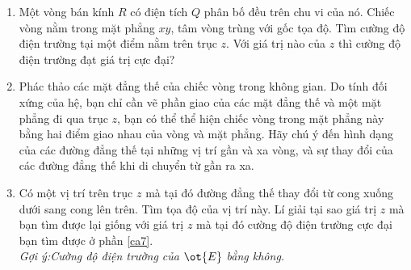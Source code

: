 \begin{vd}
    \begin{enumerate}[1)]
    \setlength{\itemsep}{0pt}
        \item Một vòng bán kính $R$ có điện tích $Q$ phân bố đều trên chu vi của nó. Chiếc vòng nằm trong mặt phẳng $xy$, tâm vòng trùng với gốc tọa độ. Tìm cường độ điện trường tại một điểm nằm trên trục $z$. Với giá trị nào của $z$ thì cường độ điện trường đạt giá trị cực đại? \label{ca7}
        \item Phác thảo các mặt đẳng thế của chiếc vòng trong không gian. Do tính đối xứng của hệ, bạn chỉ cần vẽ phần giao của các mặt đẳng thế và một mặt phẳng đi qua trục $z$, bạn có thể thể hiện chiếc vòng trong mặt phẳng này bằng hai điểm giao nhau của vòng và mặt phẳng. Hãy chú ý đến hình dạng của các đường đẳng thế tại những vị trí gần và xa vòng, và sự thay đổi của các đường đẳng thế khi di chuyển từ gần ra xa.
        \item Có một vị trí trên trục $z$ mà tại đó đường đẳng thế thay đổi từ cong xuống dưới sang cong lên trên. Tìm tọa độ của vị trí này. Lí giải tại sao giá trị $z$ mà bạn tìm được lại giống với giá trị $z$ mà tại đó cường độ điện trường cực đại bạn tìm được ở phần \ref{ca7}. \\
        \textit{Gợi ý:Cường độ điện trường của $\ot{E}$ bằng không.}
    \end{enumerate}
    \end{vd}

